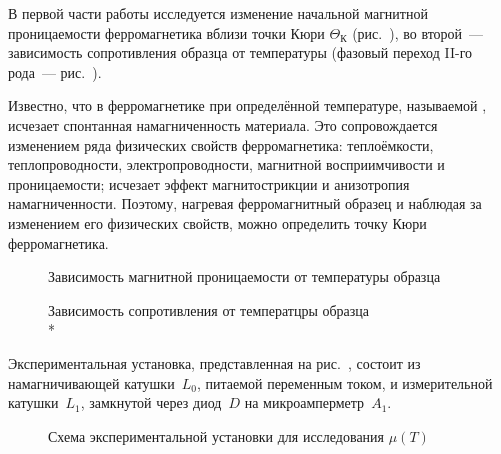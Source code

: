 






В первой части работы исследуется изменение начальной магнитной проницаемости
ферромагнетика вблизи точки Кюри $\Theta_{К}$ (рис.~), во второй~--- зависимость сопротивления образца
от температуры (фазовый переход II-го рода~--- рис.~).

Известно, что в ферромагнетике при определённой температуре, называемой
, исчезает спонтанная намагниченность материала. Это
сопровождается изменением ряда физических свойств ферромагнетика: теплоёмкости,
теплопроводности, электропроводности, магнитной восприимчивости и
проницаемости; исчезает эффект магнитострикции и анизотропия намагниченности.
Поэтому, нагревая ферромагнитный образец и наблюдая за изменением его физических
свойств, можно определить точку Кюри ферромагнетика.

\begin{figure}[h!]
    \begin{minipage}[b]{0.45\textwidth}
        \caption{Зависимость магнитной проницаемости от температуры образца}
    \end{minipage}%
    \hfill
    \begin{minipage}[b]{0.5\textwidth}
        \caption{Зависимость сопротивления от температцры образца\\*}
    \end{minipage}%
\end{figure}


\experiment
Экспериментальная установка, представленная на рис.~, состоит из намагничивающей катушки~$L_0$,
питаемой переменным током, и измерительной катушки~$L_1$, замкнутой через 
диод~$D$ на микроамперметр~$A_1$.

\begin{figure}[h!]
\centering\small
	\caption{Схема экспериментальной установки для исследования $\mu(T)$}
\end{figure}


